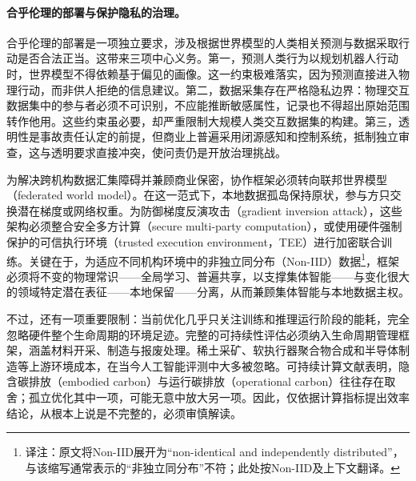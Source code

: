 \paragraph{合乎伦理的部署与保护隐私的治理。}
合乎伦理的部署是一项独立要求，涉及根据世界模型的人类相关预测与数据采取行动是否合法正当。这带来三项中心义务。第一，预测人类行为以规划机器人行动时，世界模型不得依赖基于偏见的画像\citep{billard2025roadmap}。这一约束极难落实，因为预测直接进入物理行动，而非供人拒绝的信息建议。第二，数据采集存在严格隐私边界：物理交互数据集中的参与者必须不可识别，不应能推断敏感属性，记录也不得超出原始范围转作他用\citep{billard2025roadmap}。这些约束虽必要，却严重限制大规模人类交互数据集的构建。第三，透明性是事故责任认定的前提，但商业上普遍采用闭源感知和控制系统，抵制独立审查，这与透明要求直接冲突\citep{billard2025roadmap}，使问责仍是开放治理挑战。

为解决跨机构数据汇集障碍并兼顾商业保密，协作框架必须转向联邦世界模型（federated world model）。在这一范式下，本地数据孤岛保持原状，参与方只交换潜在梯度或网络权重。为防御梯度反演攻击（gradient inversion attack），这些架构必须整合安全多方计算（secure multi-party computation），或使用硬件强制保护的可信执行环境（trusted execution environment，TEE）进行加密联合训练。关键在于，为适应不同机构环境中的非独立同分布（Non-IID）数据\footnote{译注：原文将Non-IID展开为“non-identical and independently distributed”，与该缩写通常表示的“非独立同分布”不符；此处按Non-IID及上下文翻译。}，框架必须将不变的物理常识——全局学习、普遍共享，以支撑集体智能——与变化很大的领域特定潜在表征——本地保留——分离，从而兼顾集体智能与本地数据主权。

不过，还有一项重要限制：当前优化几乎只关注训练和推理运行阶段的能耗，完全忽略硬件整个生命周期的环境足迹。完整的可持续性评估必须纳入生命周期管理框架，涵盖材料开采、制造与报废处理\citep{billard2025designing}。稀土采矿、软执行器聚合物合成和半导体制造等上游环境成本，在当今人工智能评测中大多被忽略。可持续计算文献表明，隐含碳排放（embodied carbon）与运行碳排放（operational carbon）往往存在取舍；孤立优化其中一项，可能无意中放大另一项\citep{lee2025view}。因此，仅依据计算指标提出效率结论，从根本上说是不完整的，必须审慎解读。
